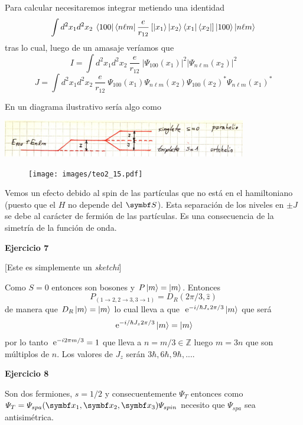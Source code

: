 \documentclass[10pt,oneside]{CBFT_book}
\begin{document}
Para calcular necesitaremos integrar metiendo una identidad
\[
	\int d^2x_1 d^2x_2 \: \Bra{100}\Bra{n\ell m}\frac{e}{r_{12}} \left[ 
	\Ket{x_1}\Ket{x_2} \Bra{x_1}\Bra{x_2}
	\right] \Ket{100}\Ket{n\ell m}
\]
tras lo cual, luego de un amasaje veríamos que
\[
	I = \int d^2x_1 d^2x_2 \: \frac{e}{r_{12}} \:
	|\Psi_{100}(x_1)|^2 |\Psi_{n\ell m}(x_2)|^2
\]
\[
	J = \int d^2x_1 d^2x_2 \: \frac{e}{r_{12}} \: 
	\Psi_{100}(x_1) \Psi_{n\ell m}(x_2) \Psi_{100}(x_2)^* \Psi_{n\ell m}(x_1)^*
\]

En un diagrama ilustrativo sería algo como

\includegraphics[width=0.8\textwidth]{images/fig_ft2_extra_identical2.jpg}

\begin{figure}[htb]
	\begin{center}
	\texttt{[image: images/teo2\_15.pdf]}
	\end{center}
	\caption{}
\end{figure} 

Vemos un efecto debido al spin de las partículas que no está en el hamiltoniano (puesto que
el $H$ no depende del $\vb S$).
Esta separación de los niveles en $\pm J$ se debe al carácter de fermión de las partículas.
Es una consecuencia de la simetría de la función de onda.

\begin{ejemplo}{\bf Ejercicio 7}

[Este es simplemente un {\it sketchi}]

Como $S=0$ entonces son bosones y $P\Ket{m} = \Ket{m}$. Entonces
\[
	P_{(1\to 2,2\to 3, 3\to 1)} = D_R(2\pi/3,\hat{z})
\]
de manera que $D_R\Ket{m} = \Ket{m}$ lo cual lleva a que $\:\mathrm{e}^{ - i / \hbar J_z 2\pi /3 } \Ket{m}$
que será
\[
	\:\mathrm{e}^{ - i / \hbar J_z 2\pi /3 } \Ket{m} = \Ket{m}
\]
por lo tanto $\:\mathrm{e}^{-i 2\pi m / 3} = 1$ que lleva a $n = m/3 \in \mathbb{Z}$ luego $m=3n$ que
son múltiplos de $n$. Los valores de $J_z$ serán $3\hbar, 6\hbar, 9\hbar, ...$.

\end{ejemplo}

\begin{ejemplo}{\bf Ejercicio 8}

Son dos fermiones, $s=1/2$ y consecuentemente $\Psi_T$ entonces como 
$\Psi_{T} = \Psi_{spa}(\vbx_1, \vbx_2, \vbx_3) \Psi_{spin}$ necesito que $\Psi_{spa}$ sea antisimétrica.

\end{ejemplo}
\end{document}
